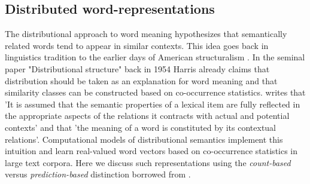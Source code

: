 \subsection{Distributed word-representations}
\label{sec:words}
The distributional approach to word meaning hypothesizes that semantically related words
tend to appear in similar contexts. This idea goes back in linguistics tradition to the
earlier days of American structuralism \citep{nevin2002legacy}. In the seminal paper
"Distributional structure" \citep{harris1954distributional} back in 1954 Harris already claims
that distribution should be taken as an explanation for word meaning and that similarity classes
can be constructed based on co-occurrence statistics.
\cite{cruse1986lexical} writes that 'It is  assumed  that  the  semantic properties  of
a lexical  item  are  fully  reflected  in  the  appropriate  aspects  of  the  relations
it  contracts  with  actual  and  potential  contexts' and that 'the  meaning  of  a word
is constituted  by  its  contextual  relations'. Computational models of distributional
semantics implement this intuition and learn real-valued word vectors based on co-occurrence
statistics in large text corpora. Here we discuss such representations using the \emph{count-based}
versus \emph{prediction-based} distinction borrowed from \cite{baroni2014don}.


